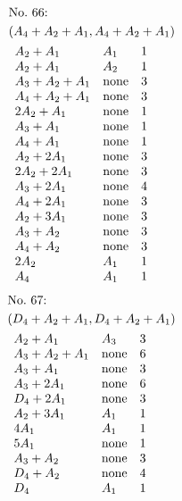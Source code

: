 \begin{align*}
&\hbox to 4cm {\textrm{No.~66:}\quad\hss}\\ 
&(A_{4}+A_{2}+A_{1}, A_{4}+A_{2}+A_{1})\\ 
&\begin{array}{lll}
A_{2}+A_{1} & A_{1} & 1\\
A_{2}+A_{1} & A_{2} & 1\\
A_{3}+A_{2}+A_{1} & \none & 3\\
A_{4}+A_{2}+A_{1} & \none & 3\\
2A_{2}+A_{1} & \none & 1\\
A_{3}+A_{1} & \none & 1\\
A_{4}+A_{1} & \none & 1\\
A_{2}+2A_{1} & \none & 3\\
2A_{2}+2A_{1} & \none & 3\\
A_{3}+2A_{1} & \none & 4\\
A_{4}+2A_{1} & \none & 3\\
A_{2}+3A_{1} & \none & 3\\
A_{3}+A_{2} & \none & 3\\
A_{4}+A_{2} & \none & 3\\
2A_{2} & A_{1} & 1\\
A_{4} & A_{1} & 1\\
\end{array}
\end{align*}
%
%
\begin{align*}
&\hbox to 4cm {\textrm{No.~67:}\quad\hss}\\ 
&(D_{4}+A_{2}+A_{1}, D_{4}+A_{2}+A_{1})\\ 
&\begin{array}{lll}
A_{2}+A_{1} & A_{3} & 3\\
A_{3}+A_{2}+A_{1} & \none & 6\\
A_{3}+A_{1} & \none & 3\\
A_{3}+2A_{1} & \none & 6\\
D_{4}+2A_{1} & \none & 3\\
A_{2}+3A_{1} & A_{1} & 1\\
4A_{1} & A_{1} & 1\\
5A_{1} & \none & 1\\
A_{3}+A_{2} & \none & 3\\
D_{4}+A_{2} & \none & 4\\
D_{4} & A_{1} & 1\\
\end{array}
\end{align*}
%
%
